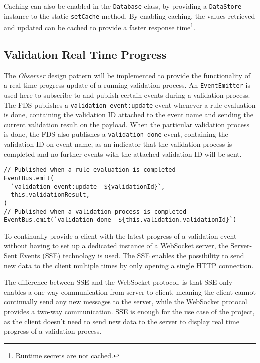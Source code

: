     Caching can also be enabled in the \verb;Database; class, by providing a \verb;DataStore; instance to the static \verb;setCache; method. By enabling caching, the values retrieved and updated can be cached to provide a faster response time\footnote{Runtime secrets are not cached.}. 

  \subsection{Validation Real Time Progress}
    \label{impl_sse}
  
    The \emph{Observer} \autocite[pp. 293-303]{gamma-1995} design pattern will be implemented to provide the functionality of a real time progress update of a running validation process. An \verb;EventEmitter; is used here to subscribe to and publish certain events during a validation process. The FDS publishes a \verb;validation_event:update; event whenever a rule evaluation is done, containing the validation ID attached to the event name and sending the current validation result on the payload. When the particular validation process is done, the FDS also publishes a \verb;validation_done; event, containing the validation ID on event name, as an indicator that the validation process is completed and no further events with the attached validation ID will be sent. 

    \begin{lstlisting}[style=es6, caption={Publishing events on certain validation events using the EventEmitter (TypeScript)}]
// Published when a rule evaluation is completed
EventBus.emit(
  `validation_event:update--${validationId}`,
  this.validationResult,
)
// Published when a validation process is completed
EventBus.emit(`validation_done--${this.validation.validationId}`)
    \end{lstlisting}
    
    To continually provide a client with the latest progress of a validation event without having to set up a dedicated instance of a WebSocket server, the Server-Sent Events (SSE)\autocite{rfc8895} technology is used. The SSE enables the possibility to send new data to the client multiple times by only opening a single HTTP connection. 
    
    The difference between SSE and the WebSocket protocol, is that SSE only enables a one-way communication from server to client, meaning the client cannot continually send any new messages to the server, while the WebSocket protocol provides a two-way communication. SSE is enough for the use case of the project, as the client doesn't need to send new data to the server to display real time progress of a validation process.


